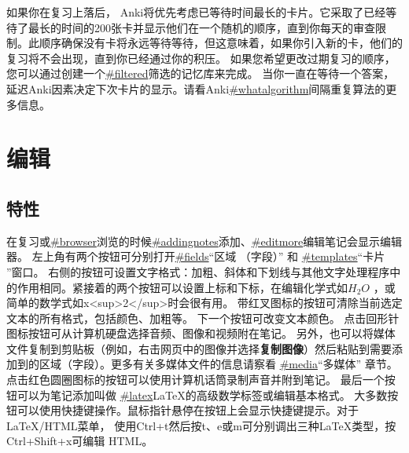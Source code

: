 \documentclass[a4paper]{book}
\begin{document}
	如果你在复习上落后， Anki将优先考虑已等待时间最长的卡片。它采取了已经等待了最长的时间的200张卡并显示他们在一个随机的顺序，直到你每天的审查限制。此顺序确保没有卡将永远等待等待，但这意味着，如果你引入新的卡，他们的复习将不会出现，直到你已经通过你的积压。
	如果您希望更改过期复习的顺序，您可以通过创建一个\url{#filtered}筛选的记忆库来完成。
	当你一直在等待一个答案，延迟Anki因素决定下次卡片的显示。请看Anki\url{#whatalgorithm}间隔重复算法的更多信息。
	
	
	\chapter{编辑}\label{}
	
	\section{特性}
	在复习或\url{#browser}浏览的时候\url{#addingnotes}添加、\url{#editmore}编辑笔记会显示编辑器。
	左上角有两个按钮可分别打开\url{#fields}“区域
	（字段）” 和
	\url{#templates}“卡片
	”窗口。
	右侧的按钮可设置文字格式：加粗、斜体和下划线与其他文字处理程序中的作用相同。紧接着的两个按钮可以设置上标和下标，在编辑化学式如$H_2O$ ，或简单的数学式如x<sup>2</sup>时会很有用。
	带红叉图标的按钮可清除当前选定文本的所有格式，包括颜色、加粗等。
	下一个按钮可改变文本颜色。
	点击回形针图标按钮可从计算机硬盘选择音频、图像和视频附在笔记。 另外，也可以将媒体文件复制到剪贴板（例如，右击网页中的图像并选择\textbf{复制图像}）然后粘贴到需要添加到的区域（字段）。更多有关多媒体文件的信息请察看
	\url{#media}“多媒体” 章节。
	点击红色圆圈图标的按钮可以使用计算机话筒录制声音并附到笔记。
	最后一个按钮可以为笔记添加叫做
	\url{#latex}LaTeX的高级数学标签或编辑基本格式。
	大多数按钮可以使用快捷键操作。鼠标指针悬停在按钮上会显示快捷键提示。对于LaTeX/HTML菜单， 使用Ctrl+t然后按t、e或m可分别调出三种LaTeX类型，按Ctrl+Shift+x可编辑 HTML。
\end{document}
